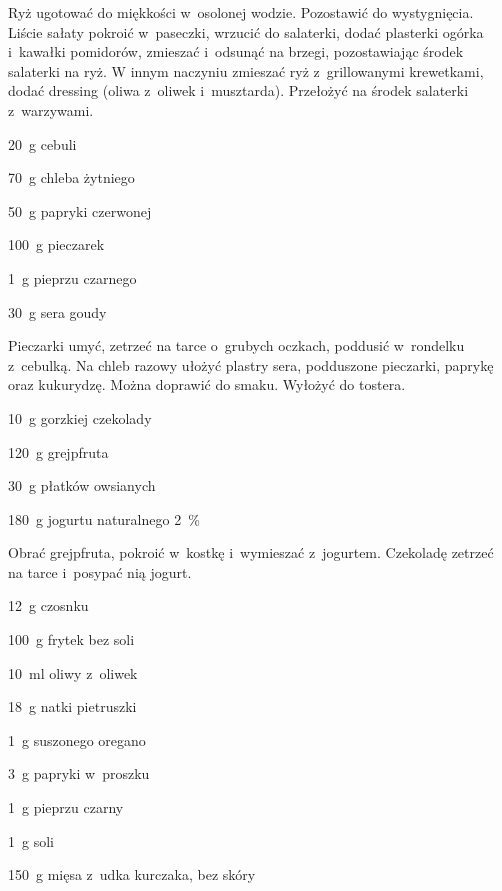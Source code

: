 \documentclass[../kucharek.tex]{subfiles}
\begin{document}
Ryż ugotować do miękkości w~osolonej wodzie. Pozostawić do wystygnięcia. Liście
sałaty pokroić w~paseczki, wrzucić do salaterki, dodać plasterki ogórka
i~kawałki pomidorów, zmieszać i~odsunąć na brzegi, pozostawiając środek
salaterki na ryż. W innym naczyniu zmieszać ryż z~grillowanymi krewetkami,
dodać dressing (oliwa z~oliwek i~musztarda). Przełożyć na środek salaterki
z~warzywami.


\begin{Ingred}
    \item \qty{20}{\gram} cebuli
    \item \qty{70}{\gram} chleba żytniego
    \item \qty{50}{\gram} papryki czerwonej
    \item \qty{100}{\gram} pieczarek
    \item \qty{1}{\gram} pieprzu czarnego
    \item \qty{30}{\gram} sera goudy
\end{Ingred}

Pieczarki umyć, zetrzeć na tarce o~grubych oczkach, poddusić w~rondelku
z~cebulką. Na chleb razowy ułożyć plastry sera, podduszone pieczarki, paprykę
oraz kukurydzę. Można doprawić do smaku. Wyłożyć do tostera.


\begin{Ingred}
    \item \qty{10}{\gram} gorzkiej czekolady
    \item \qty{120}{\gram} grejpfruta
    \item \qty{30}{\gram} płatków owsianych
    \item \qty{180}{\gram} jogurtu naturalnego \qty{2}{\percent}
\end{Ingred}

Obrać grejpfruta, pokroić w~kostkę i~wymieszać z~jogurtem. Czekoladę zetrzeć na
tarce i~posypać nią jogurt.


\begin{Ingred}
    \item \qty{12}{\gram} czosnku
    \item \qty{100}{\gram} frytek bez soli
    \item \qty{10}{\milli\litre} oliwy z~oliwek
    \item \qty{18}{\gram} natki pietruszki
    \item \qty{1}{\gram} suszonego oregano
    \item \qty{3}{\gram} papryki w~proszku
    \item \qty{1}{\gram} pieprzu czarny
    \item \qty{1}{\gram} soli
    \item \qty{150}{\gram} mięsa z~udka kurczaka, bez skóry
\end{Ingred}
\end{document}
